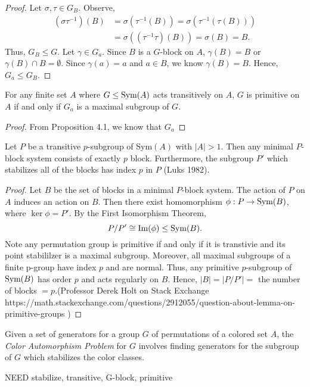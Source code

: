 \begin{proof}
Let $\sigma,\tau\in G_B$. Observe,
\begin{align*}
    (\sigma\tau^{-1})(B)&=\sigma(\tau^{-1}(B))=\sigma(\tau^{-1}(\tau(B)))\\
    &=\sigma((\tau^{-1}\tau)(B))=\sigma(B)=B.
\end{align*}
Thus, $G_B\le G$. Let $\gamma\in G_a$. Since $B$ is a $G$-block on $A$, $\gamma(B)=B$ or $\gamma(B)\cap B=\emptyset$. Since $\gamma(a)=a$ and $a\in B$, we know $\gamma(B)=B$. Hence, $G_a\le G_B$.
\end{proof}
\begin{proposition}
    For any finite set $A$ where $G\le\text{Sym}(A)$ acts transitively on $A$, $G$ is primitive on $A$ if and only if $G_a$ is a maximal subgroup of $G$.\cite[117]{dummit2004abstract}  
\end{proposition}
\begin{proof}
    From Proposition 4.1, we know that $G_a$
\end{proof}
\begin{lemma}Let $P$ be a transitive $p$-subgroup of Sym$(A)$ with $|A|>1$. Then any minimal $P$-block system consists of exactly $p$ block. Furthermore, the subgroup $P'$ which stabilizes all of the blocks has index $p$ in $P$ (Luks 1982). 
\end{lemma}
\begin{proof}
    Let $B$ be the set of blocks in a minimal $P$-block system. The action of $P$ on $A$ induces an action on $B$. Then there exist homomorphism $\phi:P\rightarrow\text{Sym}(B)$, where $\ker\phi=P'$. By the First Isomorphism Theorem, \[P/P'\cong\text{Im}(\phi)\le\text{Sym}(B).\]
    Note any permutation group is primitive if and only if it is transtivie and its point stabililzer is a maximal subgroup. Moreover, all maximal subgroups of a finite p-group have index $p$ and are normal. Thus, any primitive $p$-subgroup of $\text{Sym}(B)$ has order $p$ and acts regularly on $B$. Hence, $|B|=|P/P'|=$ the number of blocks $=p$.(Professor Derek Holt on Stack Exchange https://math.stackexchange.com/questions/2912055/question-about-lemma-on-primitive-groups )
\end{proof}
\begin{definition}
    Given a set of generators for a group $G$ of permutations of a colored set $A$, the \textit{Color Automorphism Problem} for $G$ involves finding generators for the subgroup of $G$ which stabilizes the color classes.
\end{definition}

\begin{definition}
NEED stabilize, transitive, G-block, primitive
\end{definition}
